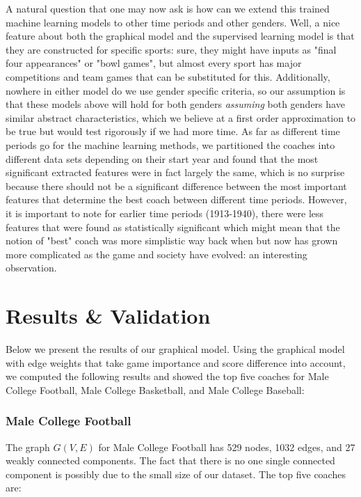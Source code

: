 \documentclass[11pt,notitlepage]{article}
\begin{document}
\vspace{2 mm}

\noindent A natural question that one may now ask is how can we extend this trained machine learning models to other time periods and other genders. Well, a nice feature about both the graphical model and the supervised learning model is that they are constructed for specific sports: sure, they might have inputs as "final four appearances" or "bowl games", but almost every sport has major competitions and team games that can be substituted for this. Additionally, nowhere in either model do we use gender specific criteria, so our assumption is that these models above will hold for both genders \textit{assuming} both genders have similar abstract characteristics, which we believe at a first order approximation to be true but would test rigorously if we had more time. As far as different time periods go for the machine learning methods, we partitioned the coaches into different data sets depending on their start year and found that the most significant extracted features were in fact largely the same, which is no surprise because there should not be a significant difference between the most important features that determine the best coach between different time periods. However, it is important to note for earlier time periods (1913-1940), there were less features that were found as statistically significant which might mean that the notion of "best" coach was more simplistic way back when but now has grown more complicated as the game and society have evolved: an interesting observation.     


\section{Results \& Validation}

Below we present the results of our graphical model. Using the graphical model with edge weights that take game importance and score difference into account, we computed the following results and showed the top five coaches for Male College Football, Male College Basketball, and Male College Baseball:

\subsubsection*{Male College Football}

\noindent The graph $G(V, E)$ for Male College Football has 529 nodes, 1032 edges, and 27 weakly connected components. The fact that there is no one single connected component is possibly due to the small size of our dataset. The top five coaches are:
\end{document}
